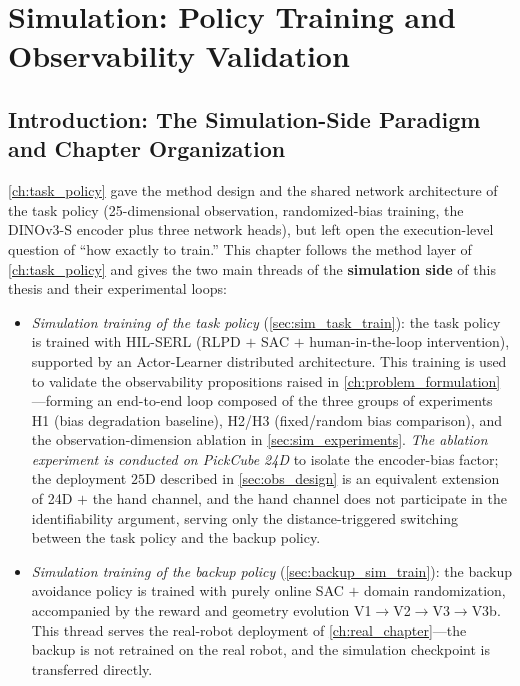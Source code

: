 
\chapter{Simulation: Policy Training and Observability Validation}\label{ch:sim_chapter}

\section{Introduction: The Simulation-Side Paradigm and Chapter Organization}\label{sec:sim_intro}

\cref{ch:task_policy} gave the method design and the shared network architecture of the task policy (25-dimensional observation, randomized-bias training, the DINOv3-S encoder plus three network heads), but left open the execution-level question of ``how exactly to train.'' This chapter follows the method layer of \cref{ch:task_policy} and gives the two main threads of the \textbf{simulation side} of this thesis and their experimental loops:

\begin{itemize}
  \item \emph{Simulation training of the task policy} (\cref{sec:sim_task_train}): the task policy is trained with HIL-SERL (RLPD $+$ SAC $+$ human-in-the-loop intervention), supported by an Actor-Learner distributed architecture. This training is used to validate the observability propositions raised in \cref{ch:problem_formulation}---forming an end-to-end loop composed of the three groups of experiments H1 (bias degradation baseline), H2/H3 (fixed/random bias comparison), and the observation-dimension ablation in \cref{sec:sim_experiments}. \emph{The ablation experiment is conducted on PickCube 24D} to isolate the encoder-bias factor; the deployment $25$D described in \cref{sec:obs_design} is an equivalent extension of 24D $+$ the hand channel, and the hand channel does not participate in the identifiability argument, serving only the distance-triggered switching between the task policy and the backup policy.
  \item \emph{Simulation training of the backup policy} (\cref{sec:backup_sim_train}): the backup avoidance policy is trained with purely online SAC $+$ domain randomization, accompanied by the reward and geometry evolution V1$\to$V2$\to$V3$\to$V3b. This thread serves the real-robot deployment of \cref{ch:real_chapter}---the backup is not retrained on the real robot, and the simulation checkpoint is transferred directly.
\end{itemize}

